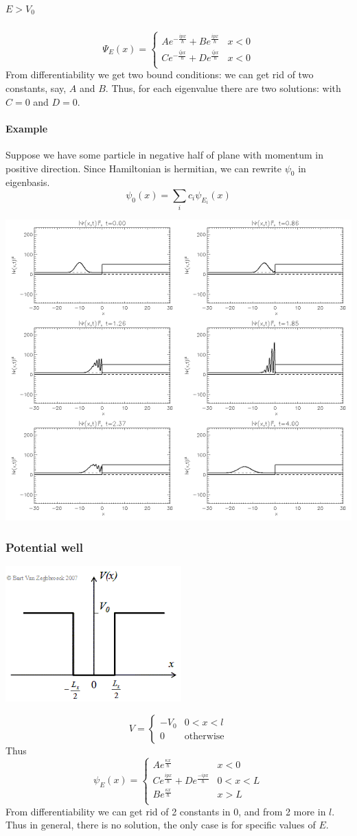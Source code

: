 \subparagraph{$E>V_0$}
$$\Psi_E(x) = \begin{cases}
Ae^{-\frac{ipx}{\hbar}}+Be^{\frac{ipx}{\hbar}}& x<0\\
Ce^{-\frac{i\tilde{p}x}{\hbar}}+De^{\frac{i\tilde{p}x}{\hbar}}& x<0\\
\end{cases}$$
From differentiability we get two bound conditions: we can get rid of two constants, say, $A$ and $B$. Thus, for each eigenvalue there are two solutions: with $C=0$ and $D=0$.

\paragraph{Example}
Suppose we have some particle in negative half of plane with momentum in positive direction. Since Hamiltonian is hermitian, we can rewrite $\psi_0$ in eigenbasis.
$$\psi_0(x) = \sum_i c_i \psi_{E_i} (x)$$
\begin{center}
	\includegraphics[width=0.5\linewidth]{./lect8/pic1.png}
\end{center}
\subsubsection{Potential well}
\begin{center}
	\includegraphics[width=0.4\linewidth]{./lect8/pic2.png}
\end{center}
$$V = \begin{cases}
-V_0 & 0<x<l\\
0 & \text{otherwise}
\end{cases}$$
Thus
$$\psi_E(x) = \begin{cases}
Ae^{\frac{\kappa x}{\hbar}}& x<0\\
Ce^{\frac{ipx}{\hbar}} +De^{\frac{-ipx}{\hbar}} & 0<x<L\\
Be^{\frac{\kappa x}{\hbar}}& x>L\\
\end{cases}$$
From differentiability we can get rid of 2 constants in 0, and from 2 more in $l$. Thus in general, there is no solution, the only case is for specific values of $E$.